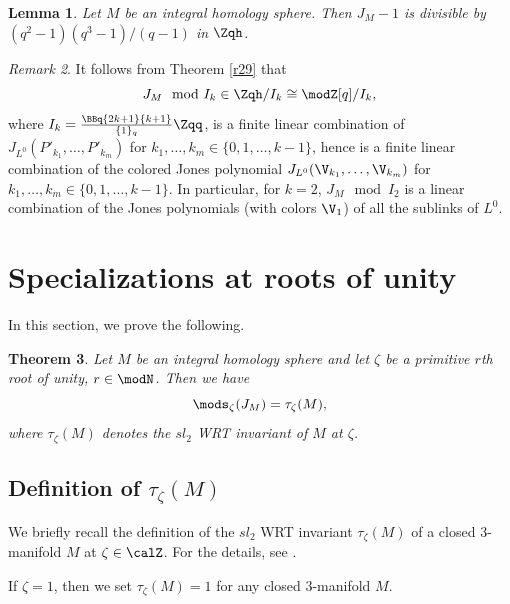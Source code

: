 \documentclass{amsart}
\numberwithin{equation}{section}
\numberwithin{figure}{section}
\theoremstyle{plain}
\newtheorem{theorem}{Theorem}[section]
\newtheorem{lemma}[theorem]{Lemma}
\theoremstyle{definition}
\theoremstyle{remark}
\newtheorem{remark}[theorem]{Remark}
\begin{document}
\begin{lemma}
  \label{r47}
  Let $M$ be an integral homology sphere.  Then $J_M-1$ is divisible
  by $(q^2-1)(q^3-1)/(q-1)$ in $\Zqh$.
\end{lemma}

\begin{remark}
  \label{r24}It follows from Theorem \ref{r29} that
  \begin{equation*}
    J_M\mod I_k\in \Zqh/I_k\cong \modZ [q]/I_k,
  \end{equation*}
  where $I_k=\frac{\BBq{2k+1}{k+1}}{\{1\}_q}\Zqq$, is a finite linear
  combination of $J_{L^0}(P'_{k_1},\ldots,P'_{k_m})$ for
  $k_1,\ldots,k_m\in \{0,1,\ldots,k-1\}$, hence is a finite linear combination
  of the colored Jones polynomial $J_{L^0}(\V_{k_1},\ldots,\V_{k_m})$ for
  $k_1,\ldots,k_m\in \{0,1,\ldots,k-1\}$.  In particular, for $k=2$, $J_M\mod
  I_2$ is a linear combination of the Jones polynomials (with colors
  $\V_1$) of all the sublinks of $L^0$.
\end{remark}

\section{Specializations at roots of unity}
\label{sec11}

In this section, we prove the following.

\begin{theorem}
  \label{thm:65}
  Let $M$ be an integral homology sphere and let $\zeta $ be a primitive
  $r$th root of unity, $r\in \modN $.  Then we have
  \begin{equation}
    \label{eq:130}
    \mods _\zeta (J_M) = \tau _\zeta (M),
  \end{equation}
  where $\tau _\zeta (M)$ denotes the $sl_2$ WRT
  invariant of $M$ at $\zeta $.
\end{theorem}

\subsection{Definition of $\tau _\zeta (M)$}
\label{sec:definition-m}

We briefly recall the definition of the $sl_2$
WRT invariant $\tau _\zeta (M)$ of a closed
$3$-manifold $M$ at  $\zeta \in \calZ$.  For the details, see
\cite{Reshetikhin-Turaev:invariants,Kirby-Melvin}.

If $\zeta =1$, then we set $\tau _\zeta (M)=1$ for any closed $3$-manifold $M$.
\end{document}

